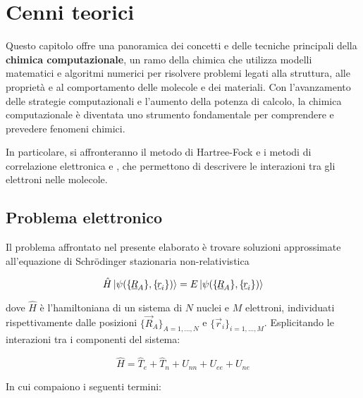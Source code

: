 \chapter{Cenni teorici}

Questo capitolo offre una panoramica dei concetti e delle tecniche principali della \textbf{chimica computazionale}, un ramo della chimica che utilizza modelli matematici e algoritmi numerici per risolvere problemi legati alla struttura, alle proprietà e al comportamento delle molecole e dei materiali. Con l’avanzamento delle strategie computazionali e l’aumento della potenza di calcolo, la chimica computazionale è diventata uno strumento fondamentale per comprendere e prevedere fenomeni chimici.

In particolare, si affronteranno il metodo di Hartree-Fock e i metodi di correlazione elettronica  e , che permettono di descrivere le interazioni tra gli elettroni nelle molecole.

\section{Problema elettronico}\label{sez:problema-elettronico}

Il problema affrontato nel presente elaborato è trovare soluzioni approssimate all'equazione di Schrödinger stazionaria non-relativistica

\begin{equation}\label{eqn:Schrödinger-stazionaria}
    \hat{H}\ket{\psi(\{\underline{\hspace{-0.1em}R\hspace{-0.05em}}_A\},\{\underline{\hspace{-0.1em}r\hspace{-0.05em}}_i\})} = E\ket{\psi(\{\underline{\hspace{-0.1em}R\hspace{-0.05em}}_A\},\{\underline{\hspace{-0.1em}r\hspace{-0.05em}}_i\})}
\end{equation}

dove $\hat{H}$ è l'hamiltoniana di un sistema di $N$ nuclei e $M$ elettroni, individuati rispettivamente dalle posizioni $\{\vec{R}_A\}_{A=1,\ldots,N}$ e $\{\vec{r}_i\}_{i=1,\ldots,M}$. Esplicitando le interazioni tra i componenti del sistema:

\begin{equation}\label{eqn:hamiltoniana-molecolare}
    \hat{H} = \hat{T}_e + \hat{T}_n + U_{nn} + U_{ee} + U_{ne}
\end{equation}

In cui compaiono i seguenti termini:

